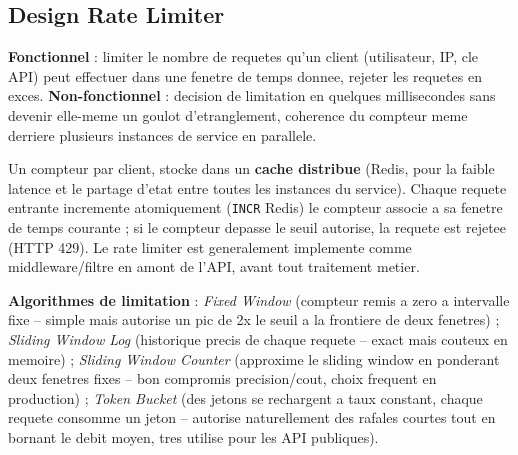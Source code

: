 \documentclass[11pt,a4paper]{article}
\newenvironment{sujet}[1]{%
  \subsection{#1}
}{%
  \bigskip
}
\begin{document}
\begin{sujet}{Design Rate Limiter}

\begin{req}
\textbf{Fonctionnel} : limiter le nombre de requetes qu'un client (utilisateur, IP, cle API) peut effectuer dans une fenetre de temps donnee, rejeter les requetes en exces. \textbf{Non-fonctionnel} : decision de limitation en quelques millisecondes sans devenir elle-meme un goulot d'etranglement, coherence du compteur meme derriere plusieurs instances de service en parallele.
\end{req}

\begin{archbox}
Un compteur par client, stocke dans un \textbf{cache distribue} (Redis, pour la faible latence et le partage d'etat entre toutes les instances du service). Chaque requete entrante incremente atomiquement (\texttt{INCR} Redis) le compteur associe a sa fenetre de temps courante ; si le compteur depasse le seuil autorise, la requete est rejetee (HTTP 429). Le rate limiter est generalement implemente comme middleware/filtre en amont de l'API, avant tout traitement metier.
\end{archbox}

\begin{tradeoff}
\textbf{Algorithmes de limitation} : \emph{Fixed Window} (compteur remis a zero a intervalle fixe -- simple mais autorise un pic de 2x le seuil a la frontiere de deux fenetres) ; \emph{Sliding Window Log} (historique precis de chaque requete -- exact mais couteux en memoire) ; \emph{Sliding Window Counter} (approxime le sliding window en ponderant deux fenetres fixes -- bon compromis precision/cout, choix frequent en production) ; \emph{Token Bucket} (des jetons se rechargent a taux constant, chaque requete consomme un jeton -- autorise naturellement des rafales courtes tout en bornant le debit moyen, tres utilise pour les API publiques).
\end{tradeoff}

\end{sujet}
\end{document}
